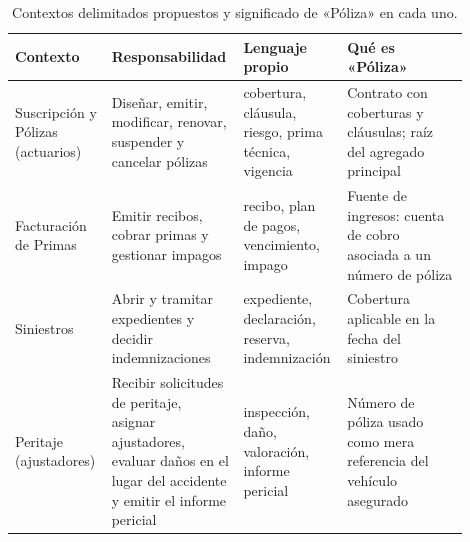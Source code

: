 \begin{table}[htbp]
  \centering
  \caption{Contextos delimitados propuestos y significado de «Póliza» en cada uno.}
  \label{tab:p3-contextos}
  \small
  \renewcommand{\arraystretch}{1.25}
  \setlength{\tabcolsep}{4pt}
  \begin{tabular}{@{}p{0.18\linewidth}p{0.25\linewidth}p{0.21\linewidth}p{0.26\linewidth}@{}}
    \toprule
    \textbf{Contexto} & \textbf{Responsabilidad} & \textbf{Lenguaje propio}
      & \textbf{Qué es «Póliza»} \\
    \midrule
    \raggedright Suscripción y Pólizas (actuarios)
      & \raggedright Diseñar, emitir, modificar, renovar, suspender y cancelar pólizas
      & \raggedright cobertura, cláusula, riesgo, prima técnica, vigencia
      & \raggedright Contrato con coberturas y cláusulas; raíz del agregado principal
      \tabularnewline
    \raggedright Facturación de Primas
      & \raggedright Emitir recibos, cobrar primas y gestionar impagos
      & \raggedright recibo, plan de pagos, vencimiento, impago
      & \raggedright Fuente de ingresos: cuenta de cobro asociada a un número de póliza
      \tabularnewline
    \raggedright Siniestros
      & \raggedright Abrir y tramitar expedientes y decidir indemnizaciones
      & \raggedright expediente, declaración, reserva, indemnización
      & \raggedright Cobertura aplicable en la fecha del siniestro
      \tabularnewline
    \raggedright Peritaje (ajustadores)
      & \raggedright Recibir solicitudes de peritaje, asignar ajustadores, evaluar daños en
        el lugar del accidente y emitir el informe pericial
      & \raggedright inspección, daño, valoración, informe pericial
      & \raggedright Número de póliza usado como mera referencia del vehículo asegurado
      \tabularnewline
    \bottomrule
  \end{tabular}
\end{table}


